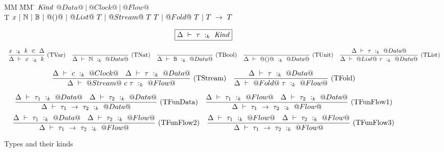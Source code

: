 
\begin{figure*}

\begin{tabbing}
MM \= MM \= \kill
$\mathit{Kind}$
\GrammarDef $@Data@~|~@Clock@~|~@Flow@$ \\

T
\GrammarDef $x~|~\mathbb{N}~|~\mathbb{B}~|~@()@
    ~|~ @List@~T
    ~|~ @Stream@~T~T
    ~|~ @Fold@~T
    ~|~ T~\to~T$ \\
\end{tabbing}

$$
\boxed{\Delta~\vdash~\tau~:_k~\mathit{Kind}}
$$

$$
\enskip \frac {\displaystyle 
    x~:_k~k~\in~\Delta
} {\displaystyle 
    \Delta~\vdash~x~:_k~k
} \  \mbox{(TVar)} \enskip
\enskip \frac {\displaystyle } {\displaystyle 
    \Delta~\vdash~\mathbb{N}~:_k~@Data@
} \  \mbox{(TNat)} \enskip
\enskip \frac {\displaystyle } {\displaystyle 
    \Delta~\vdash~\mathbb{B}~:_k~@Data@
} \  \mbox{(TBool)} \enskip
\enskip \frac {\displaystyle } {\displaystyle 
    \Delta~\vdash~@()@~:_k~@Data@
} \  \mbox{(TUnit)} \enskip
\enskip \frac {\displaystyle 
    \Delta~\vdash~\tau~:_k~@Data@
} {\displaystyle 
    \Delta~\vdash~@List@~\tau~:_k~@Data@
} \  \mbox{(TList)} \enskip
$$

$$
\enskip \frac {\displaystyle 
    \Delta~\vdash~c~:_k~@Clock@
    \quad
    \Delta~\vdash~\tau~:_k~@Data@
} {\displaystyle 
    \Delta~\vdash~@Stream@~c~\tau~:_k~@Flow@
} \  \mbox{(TStream)} \enskip
\enskip \frac {\displaystyle 
    \Delta~\vdash~\tau~:_k~@Data@
} {\displaystyle 
    \Delta~\vdash~@Fold@~\tau~:_k~@Flow@
} \  \mbox{(TFold)} \enskip
$$

$$
\enskip \frac {\displaystyle 
    \Delta~\vdash~\tau_1~:_k~@Data@
    \quad
    \Delta~\vdash~\tau_2~:_k~@Data@
} {\displaystyle 
    \Delta~\vdash~\tau_1~\to~\tau_2~:_k~@Data@
} \  \mbox{(TFunData)} \enskip
\enskip \frac {\displaystyle 
    \Delta~\vdash~\tau_1~:_k~@Flow@
    \quad
    \Delta~\vdash~\tau_2~:_k~@Data@
} {\displaystyle 
    \Delta~\vdash~\tau_1~\to~\tau_2~:_k~@Flow@
} \  \mbox{(TFunFlow1)} \enskip
$$
$$
\enskip \frac {\displaystyle 
    \Delta~\vdash~\tau_1~:_k~@Data@
    \quad
    \Delta~\vdash~\tau_2~:_k~@Flow@
} {\displaystyle 
    \Delta~\vdash~\tau_1~\to~\tau_2~:_k~@Flow@
} \  \mbox{(TFunFlow2)} \enskip
\enskip \frac {\displaystyle 
    \Delta~\vdash~\tau_1~:_k~@Flow@
    \quad
    \Delta~\vdash~\tau_2~:_k~@Flow@
} {\displaystyle 
    \Delta~\vdash~\tau_1~\to~\tau_2~:_k~@Flow@
} \  \mbox{(TFunFlow3)} \enskip
$$



\caption{Types and their kinds}
\label{fig:source:type:kinds}
\end{figure*}



